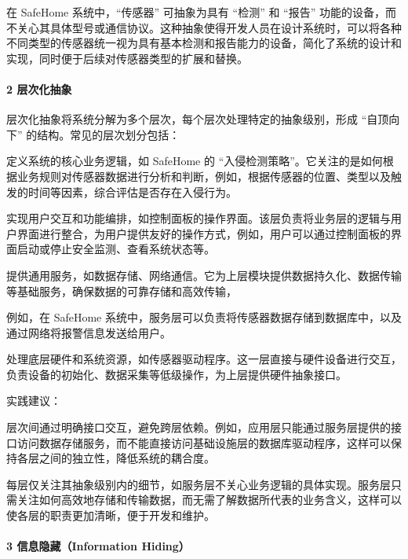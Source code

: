 在 SafeHome 系统中，``传感器'' 可抽象为具有 ``检测'' 和 ``报告'' 功能的设备，而不关心其具体型号或通信协议。这种抽象使得开发人员在设计系统时，可以将各种不同类型的传感器统一视为具有基本检测和报告能力的设备，简化了系统的设计和实现，同时便于后续对传感器类型的扩展和替换。

\hypertarget{ux5c42ux6b21ux5316ux62bdux8c61}{%
\paragraph{2 层次化抽象}\label{ux5c42ux6b21ux5316ux62bdux8c61}}

层次化抽象将系统分解为多个层次，每个层次处理特定的抽象级别，形成 ``自顶向下'' 的结构。常见的层次划分包括：

定义系统的核心业务逻辑，如 SafeHome 的 ``入侵检测策略''。它关注的是如何根据业务规则对传感器数据进行分析和判断，例如，根据传感器的位置、类型以及触发的时间等因素，综合评估是否存在入侵行为。

实现用户交互和功能编排，如控制面板的操作界面。该层负责将业务层的逻辑与用户界面进行整合，为用户提供友好的操作方式，例如，用户可以通过控制面板的界面启动或停止安全监测、查看系统状态等。

提供通用服务，如数据存储、网络通信。它为上层模块提供数据持久化、数据传输等基础服务，确保数据的可靠存储和高效传输，

例如，在 SafeHome 系统中，服务层可以负责将传感器数据存储到数据库中，以及通过网络将报警信息发送给用户。

处理底层硬件和系统资源，如传感器驱动程序。这一层直接与硬件设备进行交互，负责设备的初始化、数据采集等低级操作，为上层提供硬件抽象接口。

实践建议：

层次间通过明确接口交互，避免跨层依赖。例如，应用层只能通过服务层提供的接口访问数据存储服务，而不能直接访问基础设施层的数据库驱动程序，这样可以保持各层之间的独立性，降低系统的耦合度。

每层仅关注其抽象级别内的细节，如服务层不关心业务逻辑的具体实现。服务层只需关注如何高效地存储和传输数据，而无需了解数据所代表的业务含义，这样可以使各层的职责更加清晰，便于开发和维护。

\hypertarget{ux4fe1ux606fux9690ux85cfinformation-hiding}{%
\paragraph{3 信息隐藏（Information Hiding）}\label{ux4fe1ux606fux9690ux85cfinformation-hiding}}

